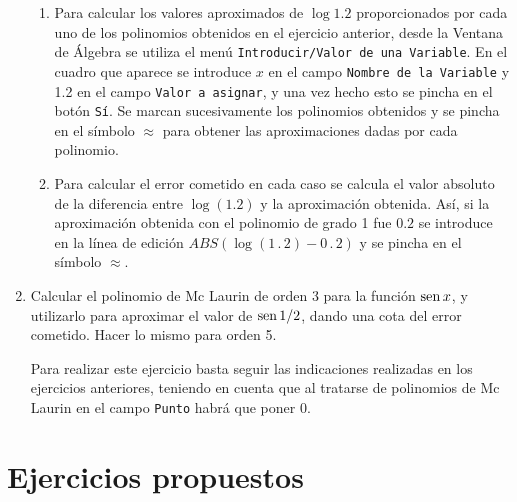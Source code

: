 \begin{enumerate}[leftmargin=*]
\begin{indicacion}
{
\begin{enumerate}
\item Para calcular los valores aproximados de $\log 1.2$ proporcionados
por cada uno de los polinomios obtenidos en el ejercicio anterior,
desde la Ventana de Álgebra se utiliza el menú
\texttt{Introducir/Valor de una Variable}. En el cuadro que aparece
se introduce $x$ en el campo \texttt{Nombre de la Variable} y 1.2 en
el campo \texttt{Valor a asignar}, y una vez hecho esto se pincha en
el botón \texttt{Sí}. Se marcan sucesivamente los polinomios
obtenidos y se pincha en el símbolo $\approx$ para obtener las
aproximaciones dadas por cada polinomio.
\item Para calcular el error cometido en cada caso se calcula el valor absoluto de la diferencia entre
$\log(1.2)$ y la aproximación obtenida. Así, si la aproximación
obtenida con el polinomio de grado 1 fue $0.2$ se introduce en la
línea de edición $ABS(\log(1\operatorname{.}2)-0\operatorname{.}2)$
y se pincha en el símbolo $\approx$.
\end{enumerate}
}
\end{indicacion}

\item Calcular el polinomio de Mc Laurin de orden 3 para la función $\mathop{\rm sen}\nolimits x$, y utilizarlo para aproximar el valor de $\mathop{\rm sen}\nolimits 1/2$, dando una cota del error cometido. Hacer lo mismo para orden 5.

\begin{indicacion}
{ Para realizar este ejercicio basta seguir las indicaciones
realizadas en los ejercicios anteriores, teniendo en cuenta que al
tratarse de polinomios de Mc Laurin en el campo \texttt{Punto} habrá
que poner $0$. }

\end{indicacion}


\end{enumerate}


\section{Ejercicios propuestos}

